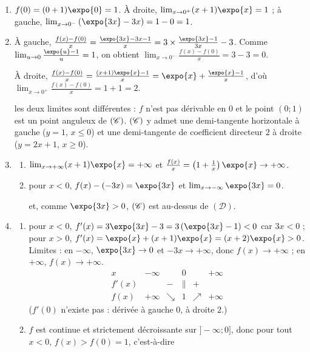 	\begin{enumerate}
		\item {}
			$f(0) = (0+1)\expo{0} = 1$.
			À droite, $\lim_{x\to0^+}(x+1)\expo{x} = 1$ ; à gauche, $\lim_{x\to0^-}\left(\expo{3x} - 3x\right) = 1 - 0 = 1$.

		\item {}
			À gauche, $\frac{f(x) - f(0)}{x} = \frac{\expo{3x} - 3x - 1}{x} = 3\times\frac{\expo{3x} - 1}{3x} - 3$.
			Comme $\lim_{u\to0}\frac{\expo{u} - 1}{u} = 1$, on obtient
			$\lim_{x\to0^-}\frac{f(x) - f(0)}{x} = 3 - 3 = 0$.

			À droite, $\frac{f(x) - f(0)}{x} = \frac{(x+1)\expo{x} - 1}{x} = \expo{x} + \frac{\expo{x} - 1}{x}$,
			d'où $\lim_{x\to0^+}\frac{f(x) - f(0)}{x} = 1 + 1 = 2$.

			les deux limites sont différentes : $f$ n'est pas dérivable en $0$ et le point $(0;1)$ est un point anguleux de $(\mathscr{C})$.
			$(\mathscr{C})$ y admet une demi-tangente horizontale à gauche ($y = 1$, $x \leq 0$) et une demi-tangente de coefficient
			directeur $2$ à droite ($y = 2x + 1$, $x \geq 0$).
		\item \begin{enumerate}
			\item {}
				$\lim_{x\to+\infty}(x+1)\expo{x} = +\infty$ et $\frac{f(x)}{x} = \left(1 + \frac{1}{x}\right)\expo{x} \to +\infty$.

			\item {}
				pour $x < 0$, $f(x) - (-3x) = \expo{3x}$ et $\lim_{x\to-\infty}\expo{3x} = 0$.


				et, comme $\expo{3x} > 0$, $(\mathscr{C})$ est au-dessus de $(\mathscr{D})$.
		\end{enumerate}
		\item \begin{enumerate}
			\item {}
				pour $x < 0$, $f'(x) = 3\expo{3x} - 3 = 3\left(\expo{3x} - 1\right) < 0$ car $3x < 0$ ;
				pour $x > 0$, $f'(x) = \expo{x} + (x+1)\expo{x} = (x+2)\expo{x} > 0$.
				Limites : en $-\infty$, $\expo{3x} \to 0$ et $-3x \to +\infty$, donc $f(x) \to +\infty$ ; en $+\infty$, $f(x) \to +\infty$.
				\[
				\begin{array}{c|ccccc}
					x & -\infty & & 0 & & +\infty \\ \hline
					f'(x) & & - & \| & + & \\ \hline
					f(x) & +\infty & \searrow & 1 & \nearrow & +\infty
				\end{array}
				\]
				($f'(0)$ n'existe pas : dérivée à gauche $0$, à droite $2$.)
			\item {}
				$f$ est continue et strictement décroissante sur $]-\infty;0]$, donc pour tout $x < 0$, $f(x) > f(0) = 1$,
				c'est-à-dire


\end{enumerate}
\end{enumerate}
